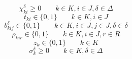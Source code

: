 \documentclass{scrartcl}
\begin{document}
\begin{equation}
\chi_{ki}^\delta \geq 0 \quad \quad k \in K, i \in J, \delta \in \Delta
\end{equation}
\begin{equation}
t_{ki} \in \{0,1\} \quad \quad k \in K, i \in J
\end{equation}
\begin{equation}
b_{kij}^\delta \in \{0,1\} \quad \quad k \in K, i \in J, j \in J, \delta \in \delta
\end{equation}
\begin{equation}
\rho_{kir} \in \{0,1\} \quad\quad k \in K, i \in J, r \in R
\end{equation}
\begin{equation}
\label{2:zk:in:0:1}
z_k \in \{0,1\} \quad \quad k \in K
\end{equation}
\begin{equation}
\label{sigma_kdelta:geq:0}
\sigma_k^\delta \geq 0 \quad\quad  k\in K, \delta \in \Delta
\end{equation}
\end{document}
